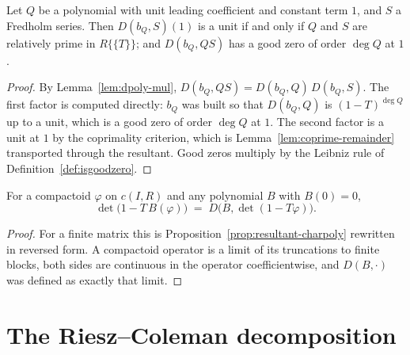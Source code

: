 \begin{lemma}
  \label{lem:dseries-goodzero}
  \leanok
  Let $Q$ be a polynomial with unit leading coefficient and constant term $1$, and $S$ a
  Fredholm series.  Then $D(b_Q, S)(1)$ is a unit if and only if $Q$ and $S$ are relatively
  prime in $R\{\{T\}\}$; and $D(b_Q, QS)$ has a good zero of order $\deg Q$ at $1$.
\end{lemma}

\begin{proof}
  \leanok
  By Lemma~\ref{lem:dpoly-mul}, $D(b_Q, QS) = D(b_Q, Q)\,D(b_Q, S)$.  The first factor is
  computed directly: $b_Q$ was built so that $D(b_Q, Q)$ is $(1-T)^{\deg Q}$ up to a unit, which
  is a good zero of order $\deg Q$ at $1$.  The second factor is a unit at $1$ by the
  coprimality criterion, which is Lemma~\ref{lem:coprime-remainder} transported through the
  resultant.  Good zeros multiply by the Leibniz rule of Definition~\ref{def:isgoodzero}.
\end{proof}

\begin{theorem}
  \label{thm:spectral-mapping}
  \leanok
  For a compactoid $\varphi$ on $c(I,R)$ and any polynomial $B$ with $B(0)=0$,
  \[
    \det\bigl(1 - T\,B(\varphi)\bigr) \;=\; D\bigl(B, \det(1-T\varphi)\bigr).
  \]
\end{theorem}

\begin{proof}
  \leanok
  For a finite matrix this is Proposition~\ref{prop:resultant-charpoly} rewritten in reversed
  form.  A compactoid operator is a limit of its truncations to finite blocks, both sides are
  continuous in the operator coefficientwise, and $D(B,\cdot)$ was defined as exactly that
  limit.
\end{proof}

\section{The Riesz--Coleman decomposition}

